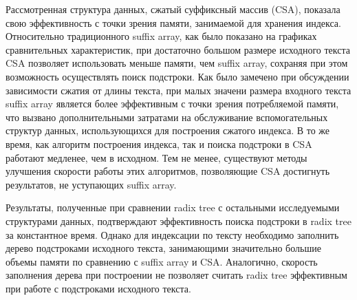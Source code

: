 
Рассмотренная структура данных, сжатый суффиксный массив (CSA), показала свою эффективность
с точки зрения памяти, занимаемой для хранения индекса. Относительно традиционного
suffix array, как было показано на графиках сравнительных характеристик,
при достаточно большом размере исходного текста CSA позволяет использовать меньше памяти, чем
suffix array, сохраняя при этом возможность осуществлять поиск подстроки.
Как было замечено при обсуждении зависимости сжатия от длины текста,
при малых значени размера входного текста suffix array является более эффективным с точки
зрения потребляемой памяти, что вызвано дополнительными затратами на обслуживание
вспомогательных структур данных, использующихся для построения сжатого индекса.
В то же время, как алгоритм построения индекса, так и поиска подстроки в CSA работают
медленее, чем в исходном. Тем не менее, существуют методы улучшения скорости
работы этих алгоритмов, позволяющие CSA достигнуть результатов, не уступающих suffix array.

Результаты, полученные при сравнении radix tree с остальными исследуемыми структурами данных,
подтверждают эффективность поиска подстроки в radix tree за константное время. Однако
для индексации по тексту необходимо заполнить дерево подстроками исходного текста,
занимающими значительно большие объемы памяти по сравнению с suffix array и CSA.
Аналогично, скорость заполнения дерева при построении не позволяет считать radix tree
эффективным при работе с подстроками исходного текста.
